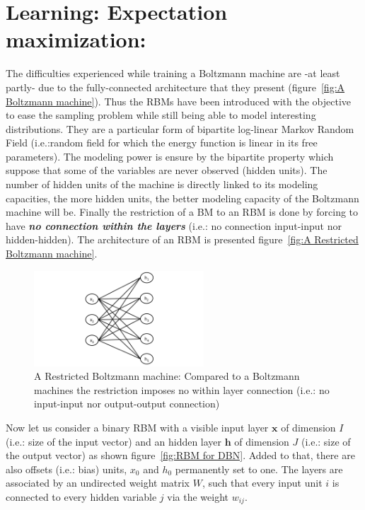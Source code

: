 \documentclass[a4paper,11pt]{report}
\newcommand{\Important}[1]{\textbf{{\em #1}}}
\begin{document}
		
	\section{Learning: Expectation maximization:}
		\label{seq:DBN/The Restricted Boltzmann machine:}
    
		The difficulties experienced while training a Boltzmann machine are -at least partly- due to the fully-connected architecture that they present (figure~\ref{fig:A Boltzmann machine}). Thus the RBMs \cite{Smolensky_1986} have been introduced with the objective to ease the sampling problem while still being able to model interesting distributions. They are a particular form of bipartite log-linear Markov Random Field (i.e.:random field for which the energy function is linear in its free parameters). The modeling power is ensure by the bipartite property which suppose that some of the variables are never observed (hidden units). The number of hidden units of the machine is directly linked to its modeling capacities, the more hidden units, the better modeling capacity of the Boltzmann machine will be. Finally the restriction of a BM to an RBM is done by forcing to have \Important{no connection within the layers} (i.e.: no connection input-input nor hidden-hidden). The architecture of an RBM is presented 
figure~\ref{fig:A 
Restricted Boltzmann machine}.
    
		\begin{figure}[H]
			\begin{center}
				\includegraphics[width=2.5in]{Images/RBM_DNN/rbm.pdf}
				\caption[A restricted Boltzmann machine]{A Restricted Boltzmann machine: Compared to a Boltzmann machines the restriction imposes no  within layer connection (i.e.: no input-input nor output-output connection)}
				\label{fig:A Restricted Boltzmann machine}
			\end{center}
		\end{figure}
		
		Now let us consider a binary RBM with a visible input layer $\mathbf{x}$ of dimension $I$ (i.e.: size of the input vector) and an hidden layer $\mathbf{h}$ of dimension $J$ (i.e.: size of the output vector) as shown figure~\ref{fig:RBM for DBN}. Added to that, there are also offsets (i.e.: bias) units, $x_{0}$ and $h_{0}$ permanently set to one. The layers are associated by an undirected weight matrix $W$, such that every input unit $i$ is connected to every hidden variable $j$ via the weight $w_{ij}$.\\	
	
\end{document}
